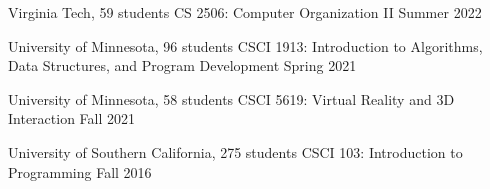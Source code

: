 
\begin{cventries}
  \cventry
    {Virginia Tech, 59 students} %
    {CS 2506: Computer Organization II} %
    {Summer 2022} %
    {} %
    {}
    \vspace{-0.15in}
    
  \cventry
    {University of Minnesota, 96 students} %
    {CSCI 1913: Introduction to Algorithms, Data Structures, and Program Development} %
    {Spring 2021} %
    {} %
    {}
    \vspace{-0.15in}
\end{cventries}

\begin{cventries}  
  \cventry
    {University of Minnesota, 58 students} %
    {CSCI 5619: Virtual Reality and 3D Interaction} %
    {Fall 2021} %
    {} %
    {}
    \vspace{-0.15in}
  
  \cventry
    {University of Southern California, 275 students} %
    {CSCI 103: Introduction to Programming} %
    {Fall 2016} %
    {} %
    {}
    \vspace{-0.15in}

\end{cventries}
